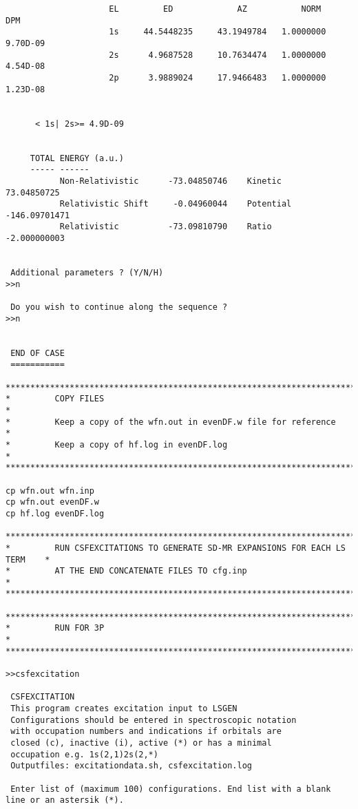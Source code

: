 \documentclass[fleqn,10pt]{book}
\begin{document}
\begin{verbatim}
                     EL         ED             AZ           NORM       DPM
                     1s     44.5448235     43.1949784   1.0000000    9.70D-09
                     2s      4.9687528     10.7634474   1.0000000    4.54D-08
                     2p      3.9889024     17.9466483   1.0000000    1.23D-08


      < 1s| 2s>= 4.9D-09


     TOTAL ENERGY (a.u.)
     ----- ------
           Non-Relativistic      -73.04850746    Kinetic       73.04850725
           Relativistic Shift     -0.04960044    Potential   -146.09701471
           Relativistic          -73.09810790    Ratio        -2.000000003


 Additional parameters ? (Y/N/H)
>>n

 Do you wish to continue along the sequence ?
>>n


 END OF CASE
 ===========
 
*******************************************************************************
*         COPY FILES                                                          *
*         Keep a copy of the wfn.out in evenDF.w file for reference           *
*         Keep a copy of hf.log in evenDF.log                                 *
*******************************************************************************

cp wfn.out wfn.inp
cp wfn.out evenDF.w
cp hf.log evenDF.log

*******************************************************************************
*         RUN CSFEXCITATIONS TO GENERATE SD-MR EXPANSIONS FOR EACH LS TERM    *
*         AT THE END CONCATENATE FILES TO cfg.inp                             *
*******************************************************************************

*******************************************************************************
*         RUN FOR 3P                                                          *
*******************************************************************************

>>csfexcitation

 CSFEXCITATION
 This program creates excitation input to LSGEN
 Configurations should be entered in spectroscopic notation
 with occupation numbers and indications if orbitals are
 closed (c), inactive (i), active (*) or has a minimal
 occupation e.g. 1s(2,1)2s(2,*)
 Outputfiles: excitationdata.sh, csfexcitation.log

 Enter list of (maximum 100) configurations. End list with a blank line or an astersik (*).


\end{verbatim}
\end{document}
